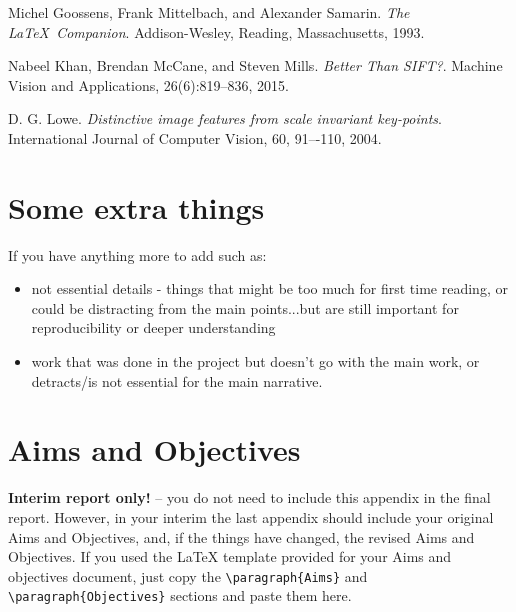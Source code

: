 \documentclass[12pt]{article}
\begin{document}

\begin{thebibliography}{9}

Michel Goossens, Frank Mittelbach, and Alexander Samarin. \textit{The \LaTeX\ Companion}. Addison-Wesley, Reading, Massachusetts, 1993.

Nabeel Khan, Brendan McCane, and Steven Mills. \textit{Better Than SIFT?}. Machine Vision and Applications, 26(6):819--836, 2015.

D. G. Lowe. \textit{Distinctive image features from scale invariant key-points}. International Journal of Computer Vision, 60, 91–-110, 2004.

\end{thebibliography}


\appendix

\renewcommand{\thesection}{Appendix \Alph{section}}

\section{Some extra things}

If you have anything more to add such as:
\begin{itemize}
\item not essential details - things that might be too much for first time reading, or could be distracting from the main points...but are still important for reproducibility or deeper understanding
\item work that was done in the project but doesn't go with the main work, or detracts/is not essential for the main narrative.  
\end{itemize}

\section{Aims and Objectives}

\textbf{Interim report only!} -- you do not need to include this appendix in the final report.  However, in your interim the last appendix should include your original Aims and Objectives, and, if the things have changed, the revised Aims and Objectives. If you used the \LaTeX{} template provided for your Aims and objectives document, just copy the \verb$\paragraph{Aims}$ and \verb$\paragraph{Objectives}$ sections and paste them here.
\end{document}
